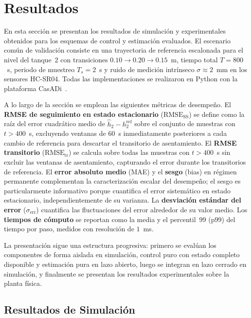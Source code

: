 \documentclass[12pt,letterpaper]{article}
\begin{document}
\section{Resultados}
\label{sec:resultados}

En esta sección se presentan los resultados de simulación y 
experimentales obtenidos para los esquemas de control y estimación 
evaluados. El escenario común de validación consiste en una 
trayectoria de referencia escalonada para el nivel del tanque~2 
con transiciones $0.10 \rightarrow 0.20 \rightarrow 0.15$~m, 
tiempo total $T = 800$~s, periodo de muestreo $T_s = 2$~s y ruido 
de medición intrínseco $\sigma \approx 2$~mm en los sensores 
HC-SR04. Todas las implementaciones se realizaron en Python con 
la plataforma CasADi~\cite{andersson2019}.

A lo largo de la sección se emplean las siguientes métricas de 
desempeño. El \textbf{RMSE de seguimiento en estado estacionario} 
($\mathrm{RMSE}_{\mathrm{SS}}$) se define como la raíz del error 
cuadrático medio de $\hat{h}_2 - h_2^{\mathrm{ref}}$ sobre el 
conjunto de muestras con $t > 400$~s, excluyendo ventanas de 
$60$~s inmediatamente posteriores a cada cambio de referencia 
para descartar el transitorio de asentamiento. El \textbf{RMSE 
transitorio} ($\mathrm{RMSE}_{\mathrm{tr}}$) se calcula sobre 
todas las muestras con $t > 400$~s sin excluir las ventanas de 
asentamiento, capturando el error durante los transitorios de 
referencia. El \textbf{error absoluto medio} (MAE) y el 
\textbf{sesgo} (bias) en régimen permanente complementan la 
caracterización escalar del desempeño; el sesgo es 
particularmente informativo porque cuantifica el error 
sistemático en estado estacionario, independientemente de su 
varianza. La \textbf{desviación estándar del error} 
($\sigma_{\mathrm{err}}$) cuantifica las fluctuaciones del 
error alrededor de su valor medio. Los \textbf{tiempos de 
cómputo} se reportan como la media y el percentil~99 (p99) 
del tiempo por paso, medidos con resolución de $1$~ms.

La presentación sigue una estructura progresiva: primero se
evalúan los componentes de forma aislada en simulación,
control puro con estado completo disponible y estimación
pura en lazo abierto, luego se integran en lazo cerrado
en simulación, y finalmente se presentan los resultados 
experimentales sobre la planta física.

\subsection{Resultados de Simulación}
\label{sec:resultados_sim}
\end{document}
